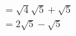 \documentclass[preview]{standalone}
\begin{document}
\begin{align*}
\quad\\&= \sqrt{4}\sqrt{5} + \sqrt{5}\quad\\&= 2\sqrt{5} - \sqrt{5}
\end{align*}
\end{document}
